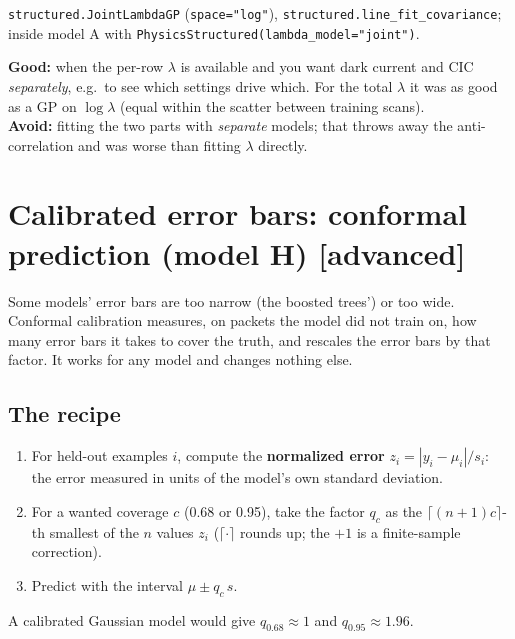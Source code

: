 \documentclass[11pt]{article}
\newcommand{\code}[1]{\texttt{#1}}
\newcommand{\level}[1]{\hfill{\normalfont\small\color{black!60}[#1]}}
\begin{document}
\begin{ours}
\code{structured.JointLambdaGP} (\code{space="log"}), \code{structured.line\_fit\_covariance}; inside model A with
\code{PhysicsStructured(lambda\_model="joint")}.
\end{ours}

\begin{when}
\textbf{Good:} when the per-row $\lambda$ is available and you want dark current and CIC \emph{separately}, e.g.\ to see which
settings drive which. For the total $\lambda$ it was as good as a GP on $\log\lambda$ (equal within the scatter between training
scans).\\
\textbf{Avoid:} fitting the two parts with \emph{separate} models; that throws away the anti-correlation and was worse than fitting
$\lambda$ directly.
\end{when}

\section{Calibrated error bars: conformal prediction (model H) \level{advanced}}
\label{sec:conformal}

\begin{idea}
Some models' error bars are too narrow (the boosted trees') or too wide. Conformal calibration measures, on packets the model did
not train on, how many error bars it takes to cover the truth, and rescales the error bars by that factor. It works for any
model and changes nothing else.
\end{idea}

\subsection{The recipe}
\begin{enumerate}
\item For held-out examples $i$, compute the \textbf{normalized error} $z_i = |y_i - \mu_i|/s_i$: the error measured in units of
  the model's own standard deviation.
\item For a wanted coverage $c$ (0.68 or 0.95), take the factor $q_c$ as the $\lceil (n+1)c\rceil$-th smallest of the $n$ values
  $z_i$ ($\lceil\cdot\rceil$ rounds up; the $+1$ is a finite-sample correction).
\item Predict with the interval $\mu \pm q_c\,s$.
\end{enumerate}
A calibrated Gaussian model would give $q_{0.68} \approx 1$ and $q_{0.95} \approx 1.96$.
\end{document}
